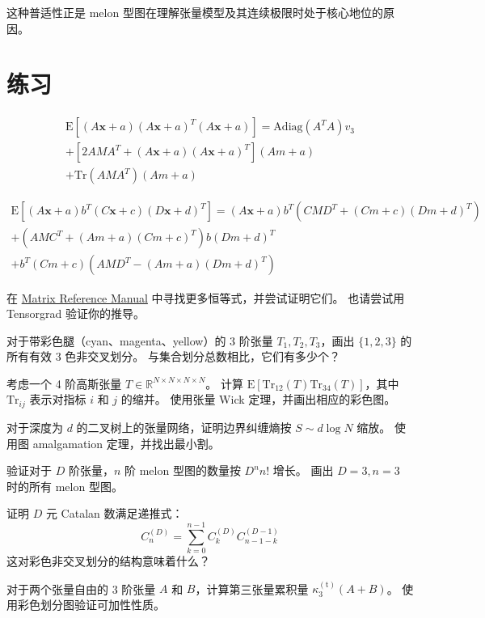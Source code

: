 这种普适性正是 melon 型图在理解张量模型及其连续极限时处于核心地位的原因。

\section{练习}
\begin{exercise}
   \begin{align*}
   \mathrm{E}[(A\mathbf{x} + a)(A\mathbf{x} + a)^T (A\mathbf{x} + a)] = 
   \mathrm{Adiag}(A^T A) v_3 \\
   + [2 AMA^T + (A\mathbf{x} + a)(A\mathbf{x} + a)^T] (Am + a) \\
   + \mathrm{Tr}(AMA^T)(Am + a)
   \end{align*}

   \begin{align*}
   \mathrm{E}[(A\mathbf{x} + a) b^T (C\mathbf{x} + c)(D\mathbf{x} + d)^T] = 
   (A\mathbf{x} + a) b^T (CMD^T + (Cm + c)(Dm + d)^T) \\
   + (AMC^T + (Am + a)(Cm + c)^T) b(Dm + d)^T \\
   + b^T (Cm + c)(AMD^T - (Am + a)(Dm + d)^T)
   \end{align*}
\end{exercise}
\begin{exercise}
   在 \href{http://www.ee.ic.ac.uk/hp/staff/dmb/matrix/expect.html}{Matrix Reference Manual} 中寻找更多恒等式，并尝试证明它们。
   也请尝试用 Tensorgrad 验证你的推导。
\end{exercise}
\begin{exercise}
   对于带彩色腿（cyan、magenta、yellow）的 3 阶张量 $T_1, T_2, T_3$，画出 $\{1,2,3\}$ 的所有有效 3 色非交叉划分。
   与集合划分总数相比，它们有多少个？
\end{exercise}
\begin{exercise}
   考虑一个 4 阶高斯张量 $T \in \mathbb{R}^{N \times N \times N \times N}$。
   计算 $\mathrm{E}[\mathrm{Tr}_{12}(T) \mathrm{Tr}_{34}(T)]$，其中 $\mathrm{Tr}_{ij}$ 表示对指标 $i$ 和 $j$ 的缩并。
   使用张量 Wick 定理，并画出相应的彩色图。
\end{exercise}
\begin{exercise}
   对于深度为 $d$ 的二叉树上的张量网络，证明边界纠缠熵按 $S \sim d \log N$ 缩放。
   使用图 amalgamation 定理，并找出最小割。
\end{exercise}
\begin{exercise}
   验证对于 $D$ 阶张量，$n$ 阶 melon 型图的数量按 $D^n n!$ 增长。
   画出 $D=3, n=3$ 时的所有 melon 型图。
\end{exercise}
\begin{exercise}
   证明 $D$ 元 Catalan 数满足递推式：
   \[
      C_n^{(D)} = \sum_{k=0}^{n-1} C_k^{(D)} C_{n-1-k}^{(D-1)}
   \]
   这对彩色非交叉划分的结构意味着什么？
\end{exercise}
\begin{exercise}
   对于两个张量自由的 3 阶张量 $A$ 和 $B$，计算第三张量累积量 $\kappa_3^{(\mathrm{t})}(A+B)$。
   使用彩色划分图验证可加性性质。
\end{exercise}
